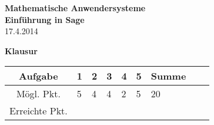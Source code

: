 \usepackage[svgnames]{xcolor} %



\parindent0cm 




\begin{center}
\textbf{\LARGE Mathematische Anwendersysteme }\\
\textbf{\LARGE Einführung in Sage}\\
\medskip
17.4.2014
\end{center}

\begin{center}
\Huge \textbf{Klausur}
\end{center}
\bigskip\bigskip\bigskip
\Large
\begin{center}
\begin{tabular}{|Sl||p{0.5cm}|p{0.5cm}|p{0.5cm}|p{0.5cm}|p{0.5cm}|Sc|}
\hline
Aufgabe & \textbf{1} & \textbf{2} & \textbf{3} & \textbf{4} & \textbf{5} & \textbf{Summe}\\
\hline
Mögl. Pkt. &  5  & 4  & 4  & 2  & 5  &  20  \\
\hline
Erreichte Pkt. &    &   &   &   &  &  \\
\hline
\end{tabular}
\end{center}

